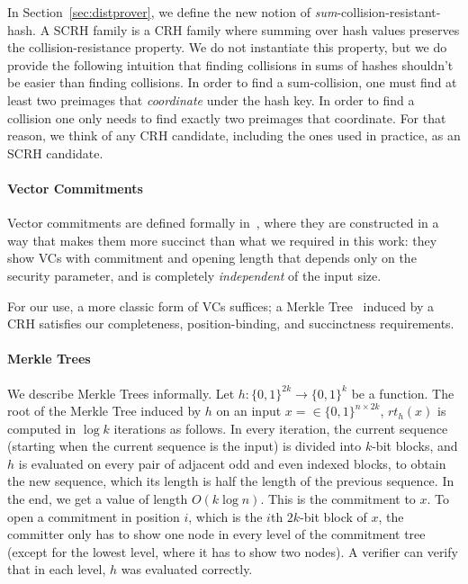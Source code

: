 In Section~\ref{sec:distprover}, we define the new notion of \emph{sum}-collision-resistant-hash. A SCRH family is a CRH family where summing over hash values preserves the collision-resistance property. We do not instantiate this property, but we do provide the following intuition that finding collisions in sums of hashes shouldn't be easier than finding collisions. In order to find a sum-collision, one must find at least two preimages that \emph{coordinate} under the hash key. In order to find a collision one only needs to find exactly two preimages that coordinate. For that reason, we think of any CRH candidate, including the ones used in practice, as an SCRH candidate.

\paragraph{Vector Commitments}
Vector commitments are defined formally in~\cite{catalano2013vector}, where they are constructed in a way that makes them more succinct than what we required in this work: they show VCs  with commitment and opening length that depends only on the security parameter, and is completely \emph{independent} of the input size.

For our use, a more classic form of VCs suffices; a Merkle Tree~\cite{merkle1989certified} induced by a CRH satisfies our completeness, position-binding, and succinctness requirements.


\paragraph{Merkle Trees} We describe Merkle Trees informally. Let $h:\{0,1\}^{2k}\to\{0,1\}^k$ be a function. The root of the Merkle Tree induced by $h$ on an input $x = \in\{0,1\}^{n\times 2k}$, $rt_h(x)$ is computed in $\log k$ iterations as follows. In every iteration, the current sequence (starting when the current sequence is the input) is divided into $k$-bit blocks, and $h$ is evaluated on every pair of adjacent odd and even indexed blocks, to obtain the new sequence, which its length is half the length of the previous sequence. In the end, we get a value of length $O(k \log n)$. This is the commitment to $x$. To open a commitment in position $i$, which is the $i$th $2k$-bit block of $x$, the committer only has to show one node in every level of the commitment tree (except for the lowest level, where it has to show two nodes). A verifier can verify that in each level, $h$ was evaluated correctly.

